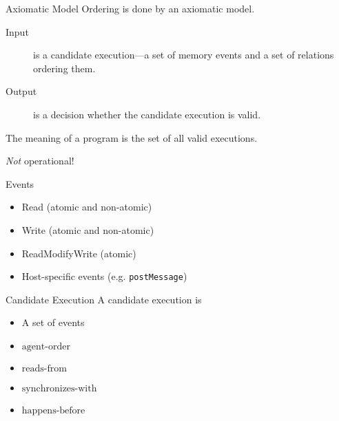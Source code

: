 \documentclass[notes]{beamer}
\begin{document}
\begin{frame}{Axiomatic Model}
  Ordering is done by an axiomatic model.

  \begin{description}
  \item[Input] is a candidate execution---a set of memory events and a set of relations ordering them.
  \item[Output] is a decision whether the candidate execution is valid.
  \end{description}

  The meaning of a program is the set of all valid executions.

  \pause

  \begin{center}
    \emph{Not} operational!
  \end{center}

\end{frame}

\begin{frame}{Events}
  \begin{itemize}
  \item Read (atomic and non-atomic)
  \item Write (atomic and non-atomic)
  \item ReadModifyWrite (atomic)
  \item Host-specific events (e.g. \texttt{postMessage})
  \end{itemize}

\end{frame}

\begin{frame}{Candidate Execution}
  A candidate execution is

  \begin{itemize}
  \item A set of events
  \item $\textrm{agent-order}$
  \item $\textrm{reads-from}$
  \item $\textrm{synchronizes-with}$
  \item $\textrm{happens-before}$
  \end{itemize}
\end{frame}
\end{document}
